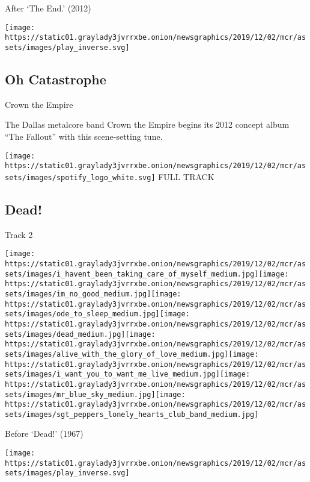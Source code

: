 After `The End.' (2012)

\texttt{[image: https://static01.graylady3jvrrxbe.onion/newsgraphics/2019/12/02/mcr/assets/images/play\_inverse.svg]}

\hypertarget{oh-catastrophe}{%
\subsection{Oh Catastrophe}\label{oh-catastrophe}}

Crown the Empire

The Dallas metalcore band Crown the Empire begins its 2012 concept album
``The Fallout'' with this scene-setting tune.

\href{https://open.spotify.com/track/7D3HLhK1pp6s5k1kGSw19F?si=OtsyU_PtQOWLSQkcSZXIIA}{}

\texttt{[image: https://static01.graylady3jvrrxbe.onion/newsgraphics/2019/12/02/mcr/assets/images/spotify\_logo\_white.svg]}
FULL TRACK

\hypertarget{dead}{%
\subsection{Dead!}\label{dead}}

Track 2

\texttt{[image: https://static01.graylady3jvrrxbe.onion/newsgraphics/2019/12/02/mcr/assets/images/i\_havent\_been\_taking\_care\_of\_myself\_medium.jpg]}\texttt{[image: https://static01.graylady3jvrrxbe.onion/newsgraphics/2019/12/02/mcr/assets/images/im\_no\_good\_medium.jpg]}\texttt{[image: https://static01.graylady3jvrrxbe.onion/newsgraphics/2019/12/02/mcr/assets/images/ode\_to\_sleep\_medium.jpg]}\texttt{[image: https://static01.graylady3jvrrxbe.onion/newsgraphics/2019/12/02/mcr/assets/images/dead\_medium.jpg]}\texttt{[image: https://static01.graylady3jvrrxbe.onion/newsgraphics/2019/12/02/mcr/assets/images/alive\_with\_the\_glory\_of\_love\_medium.jpg]}\texttt{[image: https://static01.graylady3jvrrxbe.onion/newsgraphics/2019/12/02/mcr/assets/images/i\_want\_you\_to\_want\_me\_live\_medium.jpg]}\texttt{[image: https://static01.graylady3jvrrxbe.onion/newsgraphics/2019/12/02/mcr/assets/images/mr\_blue\_sky\_medium.jpg]}\texttt{[image: https://static01.graylady3jvrrxbe.onion/newsgraphics/2019/12/02/mcr/assets/images/sgt\_peppers\_lonely\_hearts\_club\_band\_medium.jpg]}

Before `Dead!' (1967)

\texttt{[image: https://static01.graylady3jvrrxbe.onion/newsgraphics/2019/12/02/mcr/assets/images/play\_inverse.svg]}

